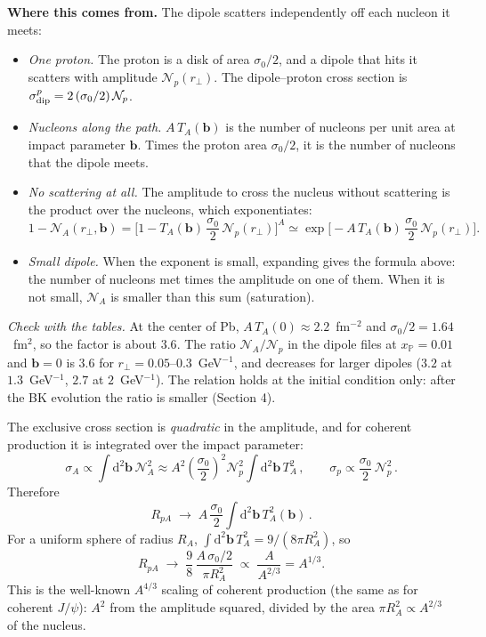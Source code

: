 \documentclass[12pt]{article}
\newcommand{\xpo}{x_{\mathbb{P}}}
\begin{document}
\textbf{Where this comes from.} The dipole scatters independently off each nucleon it meets:
\begin{itemize}
\item \emph{One proton.} The proton is a disk of area $\sigma_0/2$, and a dipole that hits it scatters
with amplitude $\mathcal{N}_p(r_\perp)$. The dipole--proton cross section is
$\sigma^p_{\rm dip}=2\,(\sigma_0/2)\,\mathcal{N}_p$.
\item \emph{Nucleons along the path.} $A\,T_A(\mathbf{b})$ is the number of nucleons per unit area at
impact parameter $\mathbf{b}$. Times the proton area $\sigma_0/2$, it is the number of nucleons that
the dipole meets.
\item \emph{No scattering at all.} The amplitude to cross the nucleus without scattering is the product
over the nucleons, which exponentiates:
\[
  1-\mathcal{N}_A(r_\perp,\mathbf{b})=\Big[1-T_A(\mathbf{b})\,\frac{\sigma_0}{2}\,\mathcal{N}_p(r_\perp)\Big]^A
  \simeq\exp\Big[-A\,T_A(\mathbf{b})\,\frac{\sigma_0}{2}\,\mathcal{N}_p(r_\perp)\Big].
\]
\item \emph{Small dipole.} When the exponent is small, expanding gives the formula above: the number of
nucleons met times the amplitude on one of them. When it is not small, $\mathcal{N}_A$ is smaller than
this sum (saturation).
\end{itemize}
\emph{Check with the tables.} At the center of Pb, $A\,T_A(0)\approx2.2$~fm$^{-2}$ and
$\sigma_0/2=1.64$~fm$^2$, so the factor is about $3.6$. The ratio $\mathcal{N}_A/\mathcal{N}_p$ in the
dipole files at $\xpo=0.01$ and $\mathbf{b}=0$ is $3.6$ for $r_\perp=0.05$--$0.3$~GeV$^{-1}$, and
decreases for larger dipoles ($3.2$ at $1.3$~GeV$^{-1}$, $2.7$ at $2$~GeV$^{-1}$). The relation holds at
the initial condition only: after the BK evolution the ratio is smaller (Section 4).

The exclusive cross section is \emph{quadratic} in the amplitude, and for coherent production it is
integrated over the impact parameter:
\[
  \sigma_A\propto\int\mathrm{d}^2\mathbf{b}\,\mathcal{N}_A^2
  \approx A^2\left(\frac{\sigma_0}{2}\right)^2\mathcal{N}_p^2\int\mathrm{d}^2\mathbf{b}\,T_A^2\,,
  \qquad
  \sigma_p\propto\frac{\sigma_0}{2}\,\mathcal{N}_p^2\,.
\]
Therefore
\[
  R_{pA}\;\longrightarrow\;A\,\frac{\sigma_0}{2}\int\mathrm{d}^2\mathbf{b}\,T_A^2(\mathbf{b})\,.
\]
For a uniform sphere of radius $R_A$, $\int\mathrm{d}^2\mathbf{b}\,T_A^2=9/(8\pi R_A^2)$, so
\[
  R_{pA}\;\longrightarrow\;\frac{9}{8}\,\frac{A\,\sigma_0/2}{\pi R_A^2}\;\propto\;\frac{A}{A^{2/3}}=A^{1/3}.
\]
This is the well-known $A^{4/3}$ scaling of coherent production (the same as for coherent $J/\psi$):
$A^2$ from the amplitude squared, divided by the area $\pi R_A^2\propto A^{2/3}$ of the nucleus.
\end{document}
